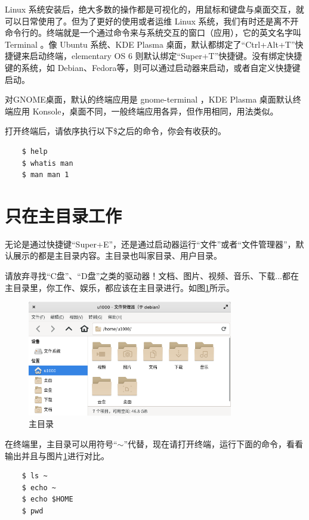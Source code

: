 \par Linux 系统安装后，绝大多数的操作都是可视化的，用鼠标和键盘与桌面交互，就可以日常使用了。但为了更好的使用或者运维 Linux 系统，我们有时还是离不开命令行的。终端就是一个通过命令来与系统交互的窗口（应用），它的英文名字叫 Terminal 。像 Ubuntu 系统、KDE Plasma 桌面，默认都绑定了“Ctrl+Alt+T”快捷键来启动终端，elementary OS 6 则默认绑定“Super+T”快捷键。没有绑定快捷键的系统，如 Debian、Fedora等，则可以通过启动器来启动，或者自定义快捷键启动。
\par 对GNOME桌面，默认的终端应用是 gnome-terminal ，KDE Plasma 桌面默认终端应用 Konsole，桌面不同，一般终端应用各异，但作用相同，用法类似。
\par 打开终端后，请依序执行以下\$之后的命令，你会有收获的。
\begin{lstlisting}
    $ help
    $ whatis man
    $ man man 1
\end{lstlisting}


\section{只在主目录工作}

\par 无论是通过快捷键“Super+E”，还是通过启动器运行“文件”或者“文件管理器”，默认展示的都是主目录内容。主目录也叫家目录、用户目录。
\par 请放弃寻找“C盘”、“D盘”之类的驱动器！文档、图片、视频、音乐、下载...都在主目录里，你工作、娱乐，都应该在主目录进行。如图\ref{fig:2021-10-28_22-31-38}所示。

\begin{figure} [htbp]
	\centering
	\includegraphics [width=0.8\textwidth]{images/ch01/2021-10-28_22-31-38.png}
	\caption{主目录}
	\label{fig:2021-10-28_22-31-38}
\end{figure}

\par 在终端里，主目录可以用符号“$\sim$”代替，现在请打开终端，运行下面的命令，看看输出并且与图片\ref{fig:2021-10-28_22-31-38}进行对比。
\begin{lstlisting}
    $ ls ~
    $ echo ~
    $ echo $HOME
    $ pwd
\end{lstlisting}


